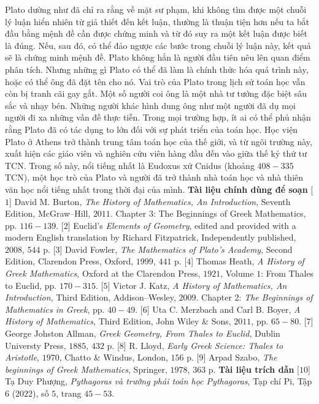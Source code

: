 \begin{multicols}{2}
	\vskip 0.1cm
	Plato dường như đã chỉ ra rằng  về mặt sư phạm, khi không tìm được một chuỗi lý luận hiển nhiên từ giả thiết đến kết luận, thường là thuận tiện hơn nếu ta bắt đầu bằng mệnh đề cần được chứng minh và từ đó suy ra một kết luận được biết là đúng. Nếu, sau đó, có thể đảo ngược các bước trong chuỗi lý luận này, kết quả sẽ là chứng minh mệnh đề. 
	\vskip 0.1cm
	Plato không hẳn là người đầu tiên nêu lên quan điểm phân tích.  Nhưng những gì Plato có thể đã làm là chính thức hóa quá trình này, hoặc có thể ông đã đặt tên cho nó.
	\vskip 0.1cm
	Vai trò của Plato trong lịch sử toán học vẫn còn bị tranh cãi gay gắt. Một số người coi ông là một nhà tư tưởng đặc biệt sâu sắc và nhạy bén. Những người khác hình dung ông như một người đã dụ mọi người đi xa những vấn đề thực tiễn. 
	\vskip 0.1cm
	Trong mọi trường hợp, ít ai có thể phủ nhận rằng Plato đã có tác dụng to lớn đối với sự phát triển của toán học. Học viện Plato ở Athens trở thành trung tâm toán học của thế giới, và từ ngôi trường này, xuất hiện các giáo viên và nghiên cứu viên hàng đầu đến vào giữa thế kỷ thứ tư TCN. Trong số này, nổi tiếng nhất là Eudoxus xứ Cnidus (khoảng $408-335$ TCN),  một học trò của Plato và người đã trở thành nhà toán học và nhà thiên văn học nổi tiếng nhất trong thời đại của mình.
	\vskip 0.1cm
	\textbf{Tài liệu chính dùng để soạn}
	\vskip 0.1cm
	[$1$] David M. Burton, \textit{The History of Mathematics, An Introduction}, Seventh Edition, McGraw--Hill, $2011$. Chapter $3$: The Beginnings of Greek Mathematics, pp. $116-139$.
	\vskip 0.1cm
	[$2$] Euclid’s \textit{Elements of Geometry}, edited and provided with a modern English translation by Richard Fitzpatrick, Independently published, $2008$, $544$ p.
	\vskip 0.1cm
	[$3$] David Fowler, \textit{The Mathematics of Plato’s Academy}, Second Edition, Clarendon Press, Oxford, $1999$, $441$ p.
	\vskip 0.1cm   
	[$4$] Thomas Heath, \textit{A History of Greek Mathematics}, Oxford at the Clarendon Press, $1921$, Volume $1$: From Thales to Euclid, pp. $170-315$.
	\vskip 0.1cm   
	[$5$] Victor J. Katz, \textit{A History of Mathematics, An Introduction}, Third Edition, Addison--Wesley, $2009$. Chapter 2: \textit{The Beginnings of Mathematics in Greek}, pp. $40-49$.
	\vskip 0.1cm
	[$6$] Uta C. Merzbach and Carl B. Boyer, \textit{A
	History of Mathematics}, Third Edition, John Wiley \& Sons, $2011$, pp. $65-80$.
	\vskip 0.1cm
	[$7$] George Johston Allman, \textit{Greek Geometry, From Thales to Euclid}, Dublin Universty Press, $1885$, $432$ p.
	\vskip 0.1cm  
	[$8$] R. Lloyd, \textit{Early Greek Science: Thales to Aristotle}, $1970$, Chatto \& Windus, London, $156$ p.
	\vskip 0.1cm 
	[$9$] Arpad Szabo, \textit{The beginnings of Greek Mathematics}, Springer, $1978$, $363$ p.
	\vskip 0.1cm
	\textbf{Tài liệu trích dẫn}
	\vskip 0.1cm
	[$10$] Tạ Duy Phượng, \textit{Pythagoras và trường phái toán học Pythagoras}, Tạp chí Pi, Tập $6$ ($2022$), số $5$, trang $45-53$.
\end{multicols}
